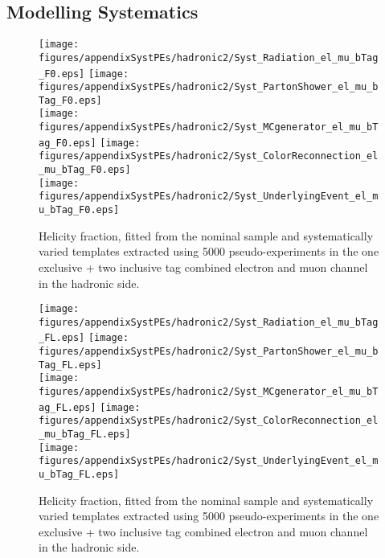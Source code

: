 
\clearpage
\subsection{Modelling Systematics}

\begin{figure}[!hb]
\begin{center}
        \texttt{[image: figures/appendixSystPEs/hadronic2/Syst\_Radiation\_el\_mu\_bTag\_F0.eps]}
        \texttt{[image: figures/appendixSystPEs/hadronic2/Syst\_PartonShower\_el\_mu\_bTag\_F0.eps]}\\
        \texttt{[image: figures/appendixSystPEs/hadronic2/Syst\_MCgenerator\_el\_mu\_bTag\_F0.eps]}
        \texttt{[image: figures/appendixSystPEs/hadronic2/Syst\_ColorReconnection\_el\_mu\_bTag\_F0.eps]}\\
        \texttt{[image: figures/appendixSystPEs/hadronic2/Syst\_UnderlyingEvent\_el\_mu\_bTag\_F0.eps]}
        
\caption{Helicity fraction, \fo fitted from the nominal \ttbar sample and systematically varied templates extracted using 5000 pseudo-experiments in the one exclusive + two inclusive \bt tag combined electron and muon channel in the hadronic side. }
\label{fig:systematicVar_lep_f0_elmu2incl_1}
\end{center}
\end{figure}

\begin{figure}[!hb]
\begin{center}
        \texttt{[image: figures/appendixSystPEs/hadronic2/Syst\_Radiation\_el\_mu\_bTag\_FL.eps]}
        \texttt{[image: figures/appendixSystPEs/hadronic2/Syst\_PartonShower\_el\_mu\_bTag\_FL.eps]}\\
        \texttt{[image: figures/appendixSystPEs/hadronic2/Syst\_MCgenerator\_el\_mu\_bTag\_FL.eps]}
        \texttt{[image: figures/appendixSystPEs/hadronic2/Syst\_ColorReconnection\_el\_mu\_bTag\_FL.eps]}\\
        \texttt{[image: figures/appendixSystPEs/hadronic2/Syst\_UnderlyingEvent\_el\_mu\_bTag\_FL.eps]}
        
\caption{Helicity fraction, \fl fitted from the nominal \ttbar sample and systematically varied templates extracted using 5000 pseudo-experiments in the one exclusive + two inclusive \bt tag combined electron and muon channel in the hadronic side. }
\label{fig:systematicVar_lep_fl_elmu2incl_1}
\end{center}
\end{figure}

